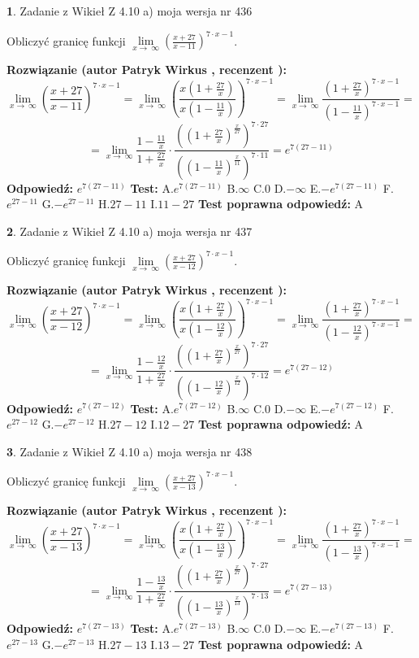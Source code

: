 \documentclass[12pt, a4paper]{article}
\theoremstyle{definition} %
\newtheorem{zad}{}
\newcommand{\zadStart}[1]{\begin{zad}#1\newline}
\newcommand{\zadStop}{\end{zad}}
\newcommand{\rozwStart}[2]{\noindent \textbf{Rozwiązanie (autor #1 , recenzent #2): }\newline}
\newcommand{\rozwStop}{\newline}
\newcommand{\odpStart}{\noindent \textbf{Odpowiedź:}\newline}
\newcommand{\odpStop}{\newline}
\newcommand{\testStart}{\noindent \textbf{Test:}\newline}
\newcommand{\testStop}{\newline}
\newcommand{\kluczStart}{\noindent \textbf{Test poprawna odpowiedź:}\newline}
\newcommand{\kluczStop}{\newline}
\begin{document}
\zadStart{Zadanie z Wikieł Z 4.10 a) moja wersja nr 436}


Obliczyć granicę funkcji  $\lim\limits_{x\to\ \infty}(\frac{x+27}{x-11})^{7\cdot x-1}$.
\zadStop
\rozwStart{Patryk Wirkus}{}
$$\lim\limits_{x\to\ \infty}(\frac{x+27}{x-11})^{7\cdot x-1} = \lim\limits_{x\to\ \infty}(\frac{x(1+\frac{27}{x})}{x(1-\frac{11}{x})})^{7\cdot x-1}=\lim\limits_{x\to\ \infty}\frac{(1+\frac{27}{x})^{7\cdot x-1}}{(1-\frac{11}{x})^{7\cdot x-1}}=$$
$$=\lim\limits_{x\to\ \infty}\frac{1-\frac{11}{x}}{1+\frac{27}{x}}\cdot\frac{((1+\frac{27}{x})^{\frac{x}{27}})^{7\cdot27}}{((1-\frac{11}{x})^{\frac{x}{11}})^{7\cdot11}}=e^{7(27-11)}$$
\rozwStop
\odpStart
$e^{7(27-11)}$
\odpStop
\testStart
A.$e^{7(27-11)}$ B.$\infty$ C.$0$ D.$-\infty$ E.$-e^{7(27-11)}$
F.$e^{27-11}$ G.$-e^{27-11}$
H.$27-11$
I.$11-27$
\testStop
\kluczStart
A
\kluczStop



\zadStart{Zadanie z Wikieł Z 4.10 a) moja wersja nr 437}


Obliczyć granicę funkcji  $\lim\limits_{x\to\ \infty}(\frac{x+27}{x-12})^{7\cdot x-1}$.
\zadStop
\rozwStart{Patryk Wirkus}{}
$$\lim\limits_{x\to\ \infty}(\frac{x+27}{x-12})^{7\cdot x-1} = \lim\limits_{x\to\ \infty}(\frac{x(1+\frac{27}{x})}{x(1-\frac{12}{x})})^{7\cdot x-1}=\lim\limits_{x\to\ \infty}\frac{(1+\frac{27}{x})^{7\cdot x-1}}{(1-\frac{12}{x})^{7\cdot x-1}}=$$
$$=\lim\limits_{x\to\ \infty}\frac{1-\frac{12}{x}}{1+\frac{27}{x}}\cdot\frac{((1+\frac{27}{x})^{\frac{x}{27}})^{7\cdot27}}{((1-\frac{12}{x})^{\frac{x}{12}})^{7\cdot12}}=e^{7(27-12)}$$
\rozwStop
\odpStart
$e^{7(27-12)}$
\odpStop
\testStart
A.$e^{7(27-12)}$ B.$\infty$ C.$0$ D.$-\infty$ E.$-e^{7(27-12)}$
F.$e^{27-12}$ G.$-e^{27-12}$
H.$27-12$
I.$12-27$
\testStop
\kluczStart
A
\kluczStop



\zadStart{Zadanie z Wikieł Z 4.10 a) moja wersja nr 438}


Obliczyć granicę funkcji  $\lim\limits_{x\to\ \infty}(\frac{x+27}{x-13})^{7\cdot x-1}$.
\zadStop
\rozwStart{Patryk Wirkus}{}
$$\lim\limits_{x\to\ \infty}(\frac{x+27}{x-13})^{7\cdot x-1} = \lim\limits_{x\to\ \infty}(\frac{x(1+\frac{27}{x})}{x(1-\frac{13}{x})})^{7\cdot x-1}=\lim\limits_{x\to\ \infty}\frac{(1+\frac{27}{x})^{7\cdot x-1}}{(1-\frac{13}{x})^{7\cdot x-1}}=$$
$$=\lim\limits_{x\to\ \infty}\frac{1-\frac{13}{x}}{1+\frac{27}{x}}\cdot\frac{((1+\frac{27}{x})^{\frac{x}{27}})^{7\cdot27}}{((1-\frac{13}{x})^{\frac{x}{13}})^{7\cdot13}}=e^{7(27-13)}$$
\rozwStop
\odpStart
$e^{7(27-13)}$
\odpStop
\testStart
A.$e^{7(27-13)}$ B.$\infty$ C.$0$ D.$-\infty$ E.$-e^{7(27-13)}$
F.$e^{27-13}$ G.$-e^{27-13}$
H.$27-13$
I.$13-27$
\testStop
\kluczStart
A
\kluczStop
\end{document}
